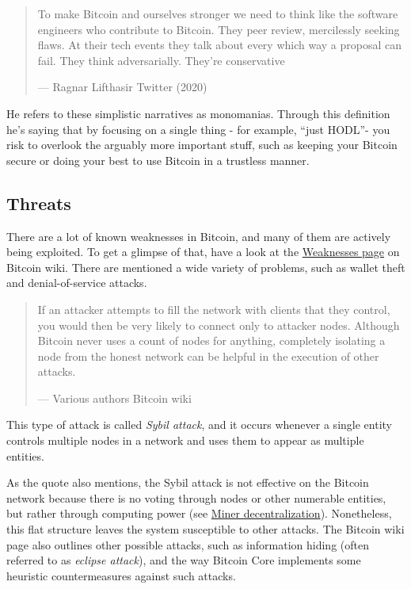 \begin{quote}
To make Bitcoin and ourselves stronger we need to think like the
software engineers who contribute to Bitcoin. They peer review,
mercilessly seeking flaws. At their tech events they talk about every
which way a proposal can fail. They think adversarially. They're
conservative

---  Ragnar Lifthasir Twitter (2020)
\end{quote}

He refers to these simplistic narratives as monomanias. Through this
definition he's saying that by focusing on a single thing - for example,
``just HODL''- you risk to overlook the arguably more important stuff,
such as keeping your Bitcoin secure or doing your best to use Bitcoin in
a trustless manner.

\hypertarget{threats}{%
\subsection{Threats}\label{threats}}

There are a lot of known weaknesses in Bitcoin, and many of them are
actively being exploited. To get a glimpse of that, have a look at the
\href{https://en.bitcoin.it/wiki/Weaknesses}{Weaknesses page} on Bitcoin
wiki. There are mentioned a wide variety of problems, such as wallet
theft and denial-of-service attacks.

\begin{quote}
If an attacker attempts to fill the network with clients that they
control, you would then be very likely to connect only to attacker
nodes. Although Bitcoin never uses a count of nodes for anything,
completely isolating a node from the honest network can be helpful in
the execution of other attacks.

---  Various authors Bitcoin wiki
\end{quote}

This type of attack is called \emph{Sybil attack}, and it occurs
whenever a single entity controls multiple nodes in a network and uses
them to appear as multiple entities.

As the quote also mentions, the Sybil attack is not effective on the
Bitcoin network because there is no voting through nodes or other
numerable entities, but rather through computing power (see
\protect\hyperlink{minerdecentralization}{Miner decentralization}).
Nonetheless, this flat structure leaves the system susceptible to other
attacks. The Bitcoin wiki page also outlines other possible attacks,
such as information hiding (often referred to as \emph{eclipse attack}),
and the way Bitcoin Core implements some heuristic countermeasures
against such attacks.


